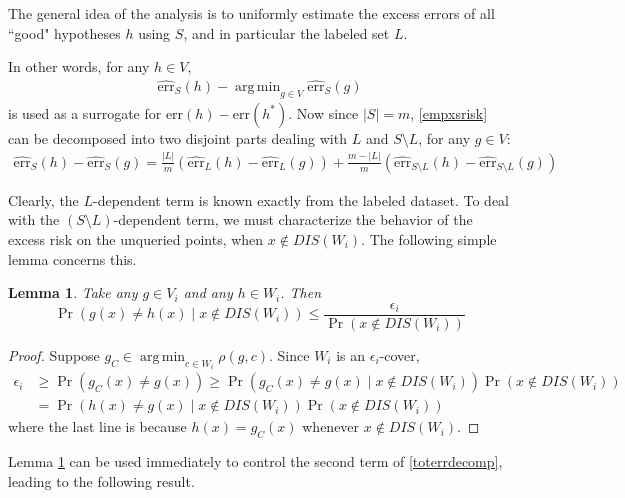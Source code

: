 \documentclass{article}[12pt]
\newtheorem{lem}[thm]{Lemma}
\theoremstyle{named}
\DeclareMathOperator*{\argmin}{arg\,min}
\DeclareMathOperator{\Prtxt}{Pr}
\newcommand{\abs}[1]{\left| #1 \right|}
\newcommand{\prp}[2]{\Prtxt_{#2} \left(#1\right)}
\newcommand{\err}[1]{\mbox{err}\left(#1\right)}
\newcommand{\emperr}[2]{\widehat{\mbox{err}}_{#2} \left(#1\right)}
\newcommand{\lrp}[1]{\left(#1\right)}
\begin{document}
The general idea of the analysis is to uniformly estimate the excess errors of all ``good" hypotheses $h$ using $S$, 
and in particular the labeled set $L$. 

In other words, for any $h \in V$,
\begin{align}
\label{empxsrisk}
\emperr{h}{S} - \argmin_{g \in V} \emperr{g}{S}
\end{align} 
is used as a surrogate for $\err{h} - \err{h^*}$. 
Now since $\abs{S} = m$, 
\eqref{empxsrisk} can be decomposed into two disjoint parts dealing with $L$ and $S \setminus L$, 
for any $g \in V$: 
\begin{align}
\label{toterrdecomp}
\emperr{h}{S} - \emperr{g}{S} = \frac{\abs{L}}{m} \lrp{\emperr{h}{L}  - \emperr{g}{L} } + 
\frac{m - \abs{L}}{m} \lrp{ \emperr{h}{S \setminus L} - \emperr{g}{S \setminus L} }
\end{align}

Clearly, 
the $L$-dependent term is known exactly from the labeled dataset. 
To deal with the $(S \setminus L)$-dependent term, 
we must characterize the behavior of the excess risk on the unqueried points, when $x \notin DIS(W_i)$. 
The following simple lemma concerns this.

\begin{lem}
\label{lem:unquerieddisregion}
Take any $g \in V_i$ and any $h \in W_i$. 
Then 
$$\prp{g(x) \neq h(x) \mid x \notin DIS(W_i)}{} \leq \frac{\epsilon_i}{\prp{x \notin DIS(W_i)}{}} $$
\end{lem}
\begin{proof}
Suppose $\displaystyle g_C \in \argmin_{c \in W_i} \rho(g, c)$. 
Since $W_i$ is an $\epsilon_i$-cover, 
\begin{align*}
\epsilon_i &\geq \prp{g_C (x) \neq g (x)}{} \geq \prp{g_C (x) \neq g (x) \mid x \notin DIS(W_i)}{} \prp{x \notin DIS(W_i)}{} \\
&= \prp{h (x) \neq g (x) \mid x \notin DIS(W_i)}{} \prp{x \notin DIS(W_i)}{}
\end{align*}
where the last line is because $h(x) = g_C(x)$ whenever $x \notin DIS(W_i)$.
\end{proof}

Lemma \ref{lem:unquerieddisregion} can be used immediately 
to control the second term of \eqref{toterrdecomp}, 
leading to the following result. 
\end{document}
